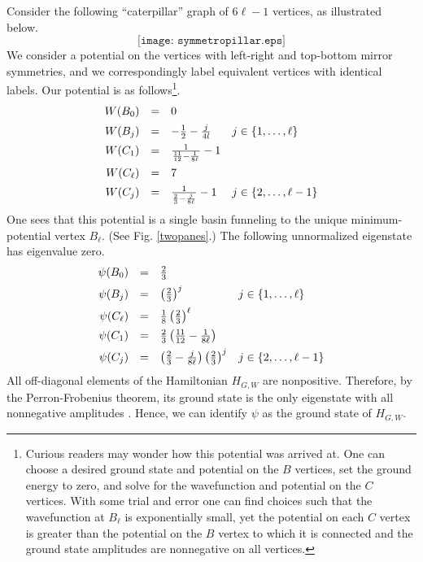 Consider the following ``caterpillar'' graph of $6 \ell - 1$ vertices, as
illustrated below.
\[
\texttt{[image: symmetropillar.eps]}
\]
We consider a potential on the vertices with left-right and top-bottom
mirror symmetries, and we correspondingly label equivalent vertices with
identical labels. Our potential is as follows\footnote{Curious readers
  may wonder how this potential was arrived at. One can choose a
  desired ground state and potential on the $B$ vertices, set the
  ground energy to zero, and solve for the wavefunction and potential
  on the $C$ vertices. With some trial and error one can find
  choices such that the wavefunction at $B_\ell$ is exponentially
  small, yet the potential on each $C$ vertex is greater than the
  potential on the $B$ vertex to which it is connected and the ground
  state amplitudes are nonnegative on all vertices.}.
\begin{equation}
\begin{array}{rcll}
W(B_0) & = & 0 & \vspace{5pt} \\
W(B_j) & = & -\frac{1}{2} - \frac{j}{4l} & j \in \{1,\ldots,\ell\}
\vspace{5pt} \\
W(C_1) & = & \frac{1}{\frac{11}{12}-\frac{1}{8 \ell}}-1 & \vspace{5pt}\\
W(C_\ell) & = & 7 & \vspace{5pt} \\
W(C_j) & = & \frac{1}{\frac{2}{3}-\frac{j}{8 \ell}} -1 & j \in
\{2,\ldots,\ell-1\}
\end{array}
\end{equation}
One sees that this potential is a single basin funneling to the unique
minimum-potential vertex $B_\ell$. (See Fig. \ref{twopanes}.) The
following unnormalized eigenstate has eigenvalue zero.
\begin{equation}
\label{psi}
\begin{array}{rcll}
\psi(B_0) & = & \frac{2}{3} & \vspace{5pt} \\
\psi(B_j) & = & \left( \frac{2}{3} \right)^j & j \in \{1,\ldots,\ell\}
\vspace{5pt} \\
\psi(C_\ell) & = & \frac{1}{8} \left( \frac{2}{3} \right)^\ell &
\vspace{5pt} \\
\psi(C_1) & = & \frac{2}{3} \left( \frac{11}{12}-\frac{1}{8 \ell}
\right)  & \vspace{5pt} \\
\psi(C_j) & = & \left( \frac{2}{3}-\frac{j}{8 \ell} \right) \left(
  \frac{2}{3} \right)^j & j \in \{2,\ldots,\ell-1\}
\end{array}
\end{equation}
All off-diagonal elements of the Hamiltonian $H_{G,W}$ are
nonpositive. Therefore, by the Perron-Frobenius theorem, its ground
state is the only eigenstate with all nonnegative amplitudes
\cite{BDOT08}. Hence, we can identify $\psi$ as the ground state of
$H_{G,W}$.

